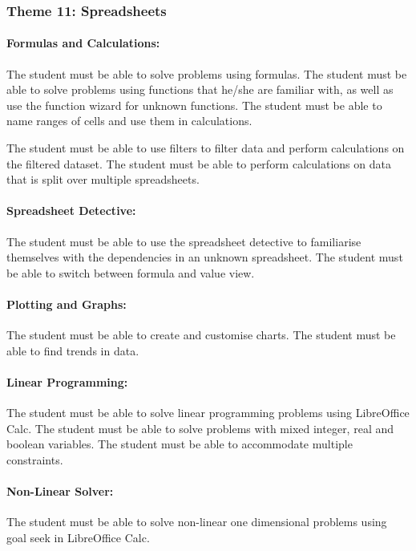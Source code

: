         \subsubsection{Theme 11: Spreadsheets}
            \paragraph{Formulas and Calculations:}
                The student must be able to solve problems using formulas. The
                student must be able to solve problems using functions that he/she
                are familiar with, as well as use the function wizard for unknown
                functions. The student must be able to name ranges of cells and use
                them in calculations.

                The student must be able to use filters to filter data and perform
                calculations on the filtered dataset. The student must be able to
                perform calculations on data that is split over multiple
                spreadsheets.

            \paragraph{Spreadsheet Detective:}
                The student must be able to use the spreadsheet detective to
                familiarise themselves with the dependencies in an unknown
                spreadsheet. The student must be able to switch between formula
                and value view.

            \paragraph{Plotting and Graphs:}
                The student must be able to create and customise charts. The
                student must be able to find trends in data.

            \paragraph{Linear Programming:}
                The student must be able to solve linear programming problems
                using LibreOffice Calc. The student must be able to solve
                problems with mixed integer, real and boolean variables. The
                student must be able to accommodate multiple constraints.

            \paragraph{Non-Linear Solver:}
                The student must be able to solve non-linear one dimensional
                problems using goal seek in LibreOffice Calc.

